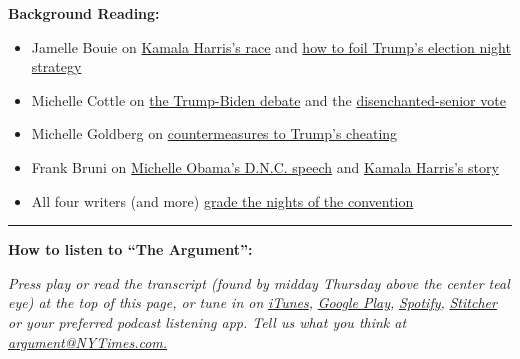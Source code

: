 \textbf{Background Reading:}

\begin{itemize}
\item
  Jamelle Bouie on
  \href{https://www.nytimes3xbfgragh.onion/2020/08/14/opinion/kamala-harris-black-identity.html}{Kamala
  Harris's race} and
  \href{https://www.nytimes3xbfgragh.onion/2020/08/11/opinion/trump-election-day.html}{how
  to foil Trump's election night strategy}
\item
  Michelle Cottle on
  \href{https://www.nytimes3xbfgragh.onion/2020/08/12/opinion/debates-trump-biden.html}{the
  Trump-Biden debate} and the
  \href{https://www.nytimes3xbfgragh.onion/2020/08/03/opinion/senior-voters-biden-trump-2020.html}{disenchanted-senior
  vote}
\item
  Michelle Goldberg on
  \href{https://www.nytimes3xbfgragh.onion/2020/08/17/opinion/trump-contested-election-protests.html}{countermeasures
  to Trump's cheating}
\item
  Frank Bruni on
  \href{https://www.nytimes3xbfgragh.onion/2020/08/18/opinion/michelle-obama-dnc-election-2020.html}{Michelle
  Obama's D.N.C. speech} and
  \href{https://www.nytimes3xbfgragh.onion/2020/08/14/opinion/kamala-harris-biden-2020.html}{Kamala
  Harris's story}
\item
  All four writers (and more)
  \href{https://www.nytimes3xbfgragh.onion/interactive/2020/08/19/opinion/democratic-convention-best-worst-night-2.html}{grade
  the nights of the convention}
\end{itemize}

\begin{center}\rule{0.5\linewidth}{\linethickness}\end{center}

\textbf{How to listen to ``The Argument'':}

\emph{Press play or read the transcript (found by midday Thursday above
the center teal eye) at the top of this page, or tune in on}
\href{https://itunes.apple.com/us/podcast/the-argument/id1438024613?mt=2}{\emph{iTunes}}\emph{,}
\href{https://play.google.com/music/listen?u=0\#/ps/Idxib4hsg3yviao4gtym76knjjy}{\emph{Google
Play}}\emph{,}
\href{https://open.spotify.com/episode/5fIsHqqunLBwoxPSUUSGre?si=Rz5D9VnlRFKdGMu8ixzBOw}{\emph{Spotify}}\emph{,}
\href{https://www.stitcher.com/podcast/the-new-york-times/the-argument}{\emph{Stitcher}}
\emph{or your preferred podcast listening app. Tell us what you think
at} \href{mailto:argument@NYTimes.com}{\emph{argument@NYTimes.com.}}


